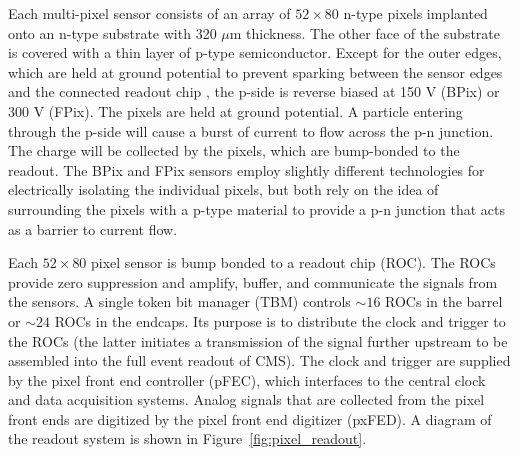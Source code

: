 \documentclass[dissertation.tex]{subfiles}
\begin{document}
Each multi-pixel sensor consists of an array of $52\times80$ n-type pixels implanted onto an n-type substrate with 320 $\mu\mbox{m}$ thickness.  The other face of the substrate is covered with a thin layer of p-type semiconductor.  Except for the outer edges, which are held at ground potential to prevent sparking between the sensor edges and the connected readout chip \cite{pixel_design_paper}, the p-side is reverse biased at 150 V (BPix) or 300 V (FPix).  The pixels are held at ground potential.  A particle entering through the p-side will cause a burst of current to flow across the p-n junction.  The charge will be collected by the pixels, which are bump-bonded to the readout.  The BPix and FPix sensors employ slightly different technologies for electrically isolating the individual pixels, but both rely on the idea of surrounding the pixels with a p-type material to provide a p-n junction that acts as a barrier to current flow.

Each $52\times80$ pixel sensor is bump bonded to a readout chip (ROC).  The ROCs provide zero suppression and amplify,  buffer, and communicate the signals from the sensors.  A single token bit manager (TBM) controls $\sim16$ ROCs in the barrel or $\sim24$ ROCs in the endcaps.  Its purpose is to distribute the clock and trigger to the ROCs (the latter initiates a transmission of the signal further upstream to be assembled into the full event readout of CMS).  The clock and trigger are supplied by the pixel front end controller (pFEC), which interfaces to the central clock and data acquisition systems.  Analog signals that are collected from the pixel front ends are digitized by the pixel front end digitizer (pxFED).  A diagram of the readout system is shown in Figure~\ref{fig:pixel_readout}.
\end{document}
